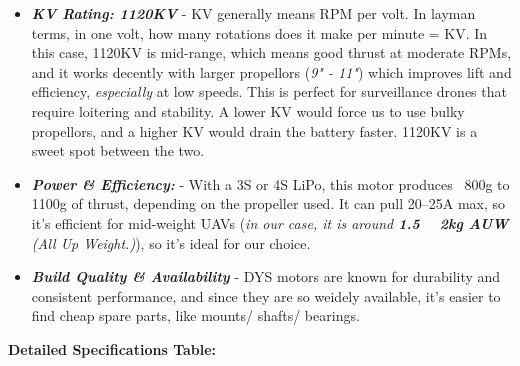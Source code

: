 \documentclass[12pt]{report}
\begin{document}
      \begin{itemize}
        \item \textbf{\textit{KV Rating: 1120KV}} - KV generally means RPM per volt. In layman terms, in one volt, how many rotations does it make per minute = KV. In this case, 1120KV is mid-range, which means good thrust at moderate RPMs, and it works decently with larger propellors (\textit{9" - 11"}) which improves lift and efficiency, \textit{especially} at low speeds. This is perfect for surveillance drones that require loitering and stability. A lower KV would force us to use bulky propellors, and a higher KV would drain the battery faster. 1120KV is a sweet spot between the two.
        \item \textbf{\textit{Power \& Efficiency:}} - With a 3S or 4S LiPo, this motor produces ~800g to 1100g of thrust, depending on the propeller used. It can pull 20–25A max, so it's efficient for mid-weight UAVs (\textit{in our case, it is around \textbf{1.5 ~ 2kg AUW} (All Up Weight.)}), so it's ideal for our choice.
        \item \textbf{\textit{Build Quality \& Availability}} - DYS motors are known for durability and consistent performance, and since they are so weidely available, it's easier to find cheap spare parts, like mounts/ shafts/ bearings.
      \end{itemize}
      \textbf{Detailed Specifications Table:}
      \renewcommand{\arraystretch}{1.5}
\end{document}
